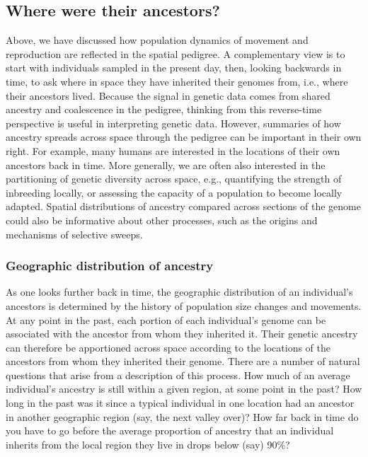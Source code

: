 \documentclass{ar-1col}
\begin{document}
\subsection{Where were their ancestors?}

Above, we have discussed how population dynamics of movement and reproduction
are reflected in the spatial pedigree.
A complementary view is to
start with individuals sampled in the present day,
then, looking backwards in time,
to ask where in space they have inherited their genomes from, 
i.e., where their ancestors lived.
Because the signal in genetic data comes from 
shared ancestry and coalescence in the pedigree,
thinking from this reverse-time perspective 
is useful in interpreting genetic data.
However, summaries of how ancestry spreads across space 
through the pedigree can be important in their own right.
For example, many humans are interested
in the locations of their own ancestors back in time.
More generally,
we are often also interested in the partitioning of genetic diversity across space,
e.g.,
quantifying the strength of inbreeding locally,
or assessing the capacity of a population to become locally adapted.
Spatial distributions of ancestry compared across sections of the genome
could also be informative about other processes, such as
the origins and mechanisms of selective sweeps.


\subsubsection{Geographic distribution of ancestry}

As one looks further back in time,
the geographic distribution of an individual's ancestors
is determined by the history of population size changes and movements.
At any point in the past,
each portion of each individual's genome can be associated 
with the ancestor from whom they inherited it.
Their genetic ancestry can therefore be apportioned across space according
to the locations of the ancestors from whom they inherited their genome.
There are a number of natural questions that arise from a description of this process.
How much of an average individual's ancestry is still within a given region, 
at some point in the past?
How long in the past was it since a typical individual in one location had an ancestor
in another geographic region (say, the next valley over)?
How far back in time do you have to go before 
the average proportion of ancestry that an individual inherits
from the local region they live in drops below (say) 90\%?
\end{document}
